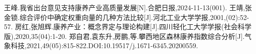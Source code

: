 \documentclass[12pt,a4paper]{article}
\begin{document}
\newpage
\begin{thebibliography}{99}
         王峰.我省出台意见支持康养产业高质量发展[N].合肥日报,2024-11-13(001).
         王靖,张金锁.综合评价中确定权重向量的几种方法比较[J].河北工业大学学报,2001,(02):52-57.
         房红,张旭辉.康养产业：概念界定与理论构建[J].四川轻化工大学学报(社会科学版),2020,35(04):1-20.
         郑自君,袁东升,房鹏,等.攀西地区森林康养指数综合分析[J].气象科技,2021,49(05):815-822.DOI:10.19517/j.1671-6345.20200559.

\end{thebibliography}
\end{document}
